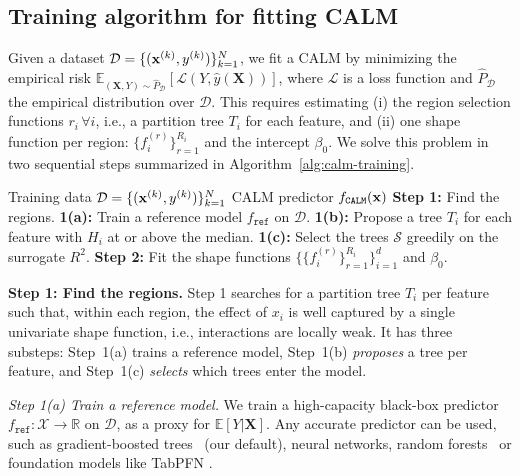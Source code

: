 \subsection{Training algorithm for fitting CALM}
\label{subsec:training}

Given a dataset \( \mathcal{D} = \{(\mathbf{x}^{(k)}, y^{(k)})\}_{k=1}^N \), we fit a CALM
by minimizing the empirical risk
\( \mathbb{E}_{(\mathbf{X}, Y) \sim \hat{P}_{\mathcal{D}}}\left [ \mathcal{L}(Y, \hat{y}(\mathbf{X})) \right ] \),
where $\mathcal{L}$ is a loss function
and
$\hat{P}_{\mathcal{D}}$ the empirical distribution over $\mathcal{D}$.
This requires estimating
(i) the region selection functions \( r_i \, \forall i \), i.e., a partition tree $T_i$ for each feature, and
(ii) one shape function per region: $\{f_i^{(r)}\}_{r=1}^{R_i}$ and the intercept $\beta_0$.
We solve this problem in two sequential steps summarized in Algorithm~\ref{alg:calm-training}.
\begin{algorithm}[tb]
\caption{Training a CALM model}
\label{alg:calm-training}
\begin{algorithmic}[1]
\renewcommand{\algorithmicensure}{\textbf{Output:}} %
\REQUIRE Training data \( \mathcal{D} = \{(\mathbf{x}^{(k)}, y^{(k)})\}_{k=1}^N \)
\ENSURE CALM predictor \( f_{\texttt{CALM}}(\mathbf{x}) \)
\STATE \textbf{Step 1:} Find the regions.
\STATE \quad \textbf{1(a):} Train a reference model \( f_{\texttt{ref}} \) on \( \mathcal{D} \).
\STATE \quad \textbf{1(b):} Propose a tree \( T_i \) for each feature with \( H_i \) at or above the median. 
\STATE \quad \textbf{1(c):} Select the trees \( \mathcal{S} \) greedily on the surrogate \( R^2 \). 
\STATE \textbf{Step 2:} Fit the shape functions \( \{ \{f_i^{(r)}\}_{r=1}^{R_i} \}_{i=1}^d \) and \( \beta_0 \). 
\end{algorithmic}
\end{algorithm}

\textbf{Step 1: Find the regions.}
Step 1 searches for a partition tree $T_i$ per feature such that, within each region, the effect of $x_i$ is well captured by a single univariate shape function, i.e., interactions are locally weak.
It has three substeps:
Step~1(a) trains a reference model,
Step~1(b) \emph{proposes} a tree per feature, and
Step~1(c) \emph{selects} which trees enter the model.

\textit{Step 1(a) Train a reference model.}
We train a high-capacity black-box predictor \( f_{\texttt{ref}} : \mathcal{X} \to \mathbb{R} \) on \( \mathcal{D}\), as a proxy for \( \mathbb{E}[Y | \mathbf{X} ] \).
Any accurate predictor can be used, such as gradient-boosted trees~\cite{chen2016xgboost} (our default), neural networks, random forests~\cite{breiman2001random} or foundation models like TabPFN \cite{hollmann2022tabpfn}.


